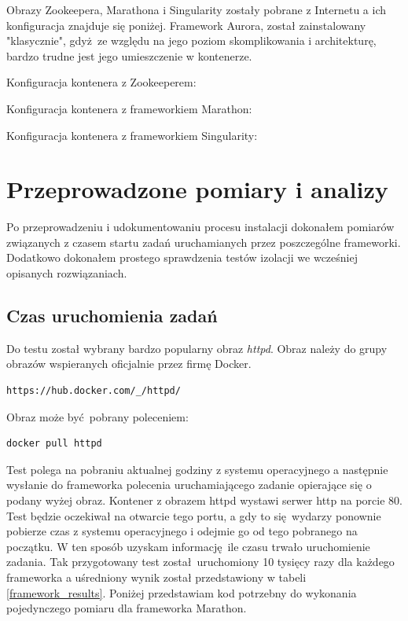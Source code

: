 \documentclass[10pt,a4paper,titlepage,twoside]{report}
\begin{document}
Obrazy Zookeepera, Marathona i Singularity zostały pobrane z Internetu a ich konfiguracja znajduje się poniżej. Framework Aurora, został zainstalowany "klasycznie", gdyż ze względu na jego poziom skomplikowania i architekturę, bardzo trudne jest jego umieszczenie w kontenerze. 

Konfiguracja kontenera z Zookeeperem:


Konfiguracja kontenera z frameworkiem Marathon:


Konfiguracja kontenera z frameworkiem Singularity:


\section{Przeprowadzone pomiary i analizy}
Po przeprowadzeniu i udokumentowaniu procesu instalacji dokonałem pomiarów związanych z czasem startu zadań uruchamianych przez poszczególne frameworki. Dodatkowo dokonałem prostego sprawdzenia testów izolacji we wcześniej opisanych rozwiązaniach.

\subsection{Czas uruchomienia zadań}
Do testu został wybrany bardzo popularny obraz \textit{httpd}. Obraz należy do grupy obrazów wspieranych oficjalnie przez firmę Docker. 
\begin{lstlisting}
https://hub.docker.com/_/httpd/
\end{lstlisting}

Obraz może być pobrany poleceniem:
\begin{lstlisting}
docker pull httpd
\end{lstlisting}

Test polega na pobraniu aktualnej godziny z systemu operacyjnego a następnie wysłanie do frameworka polecenia uruchamiającego zadanie opierające się o podany wyżej obraz. Kontener z obrazem httpd wystawi serwer http na porcie 80. Test będzie oczekiwał na otwarcie tego portu, a gdy to się wydarzy ponownie pobierze czas z systemu operacyjnego i odejmie go od tego pobranego na początku. W ten sposób uzyskam informację ile czasu trwało uruchomienie zadania. Tak przygotowany test został uruchomiony 10 tysięcy razy dla każdego frameworka a uśredniony wynik został przedstawiony w tabeli \ref{framework_results}. Poniżej przedstawiam kod potrzebny do wykonania pojedynczego pomiaru dla frameworka Marathon.
\end{document}
